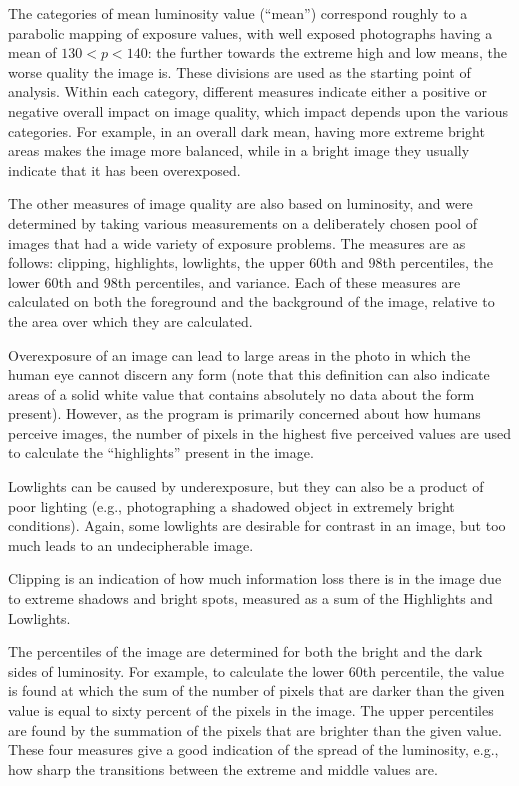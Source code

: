 \documentclass{article}
\begin{document}
The categories of mean luminosity value (“mean”) correspond roughly to a parabolic mapping of exposure values, with well exposed photographs having a mean of \(130<p<140\): the further towards the extreme high and low means, the worse quality the image is. These divisions are used as the starting point of analysis. Within each category, different measures indicate either a positive or negative overall impact on image quality, which impact depends upon the various categories. For example, in an overall dark mean, having more extreme bright areas makes the image more balanced, while in a bright image they usually indicate that it has been overexposed.

The other measures of image quality are also based on luminosity, and were determined by taking various measurements on a deliberately chosen pool of images that had a wide variety of exposure problems. The measures are as follows: clipping, highlights, lowlights, the upper 60th and 98th percentiles, the lower 60th and 98th percentiles, and variance. Each of these measures are calculated on both the foreground and the background of the image, relative to the area over which they are calculated.

Overexposure of an image can lead to large areas in the photo in which the human eye cannot discern any form (note that this definition can also indicate areas of a solid white value that contains absolutely no data about the form present). However, as the program is primarily concerned about how humans perceive images, the number of pixels in the highest five perceived values are used to calculate the “highlights” present in the image.

Lowlights can be caused by underexposure, but they can also be a product of poor lighting (e.g., photographing a shadowed object in extremely bright conditions). Again, some lowlights are desirable for contrast in an image, but too much leads to an undecipherable image.

Clipping is an indication of how much information loss there is in the image due to extreme shadows and bright spots, measured as a sum of the Highlights and Lowlights.

The percentiles of the image are determined for both the bright and the dark sides of luminosity. For example, to calculate the lower 60th percentile, the value is found at which the sum of the number of pixels that are darker than the given value is equal to sixty percent of the pixels in the image. The upper percentiles are found by the summation of the pixels that are brighter than the given value. These four measures give a good indication of the spread of the luminosity, e.g., how sharp the transitions between the extreme and middle values are.
\end{document}
